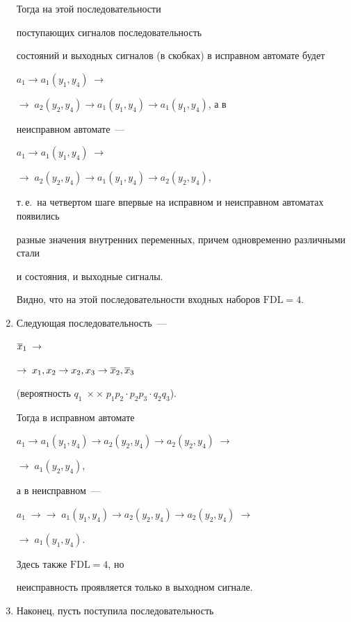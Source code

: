 \begin{multicols}{2}
\begin{enumerate}[(1)]
Тогда на этой последовательности\linebreak


 по\-сту\-па\-ющих сигналов последовательность


состояний и выходных сигналов (в скобках) в исправном автомате будет


$a_1 \to a_1(y_1,y_4)\; \to$\linebreak


$\to\;a_2(y_2,y_4) \to a_1(y_1,y_4) \to a_1(y_1,y_4)$, а в


неисправном автомате~---


$a_1 \to a_1(y_1,y_4)\; \to$\linebreak


$\to\;a_2(y_2,y_4) \to a_1(y_1,y_4) \to a_2(y_2,y_4)$,


т.\,е.\ на четвертом шаге впервые на исправном и неисправном автоматах появились


разные значения внутренних переменных, причем одновременно различными стали


и состояния, и выходные сигналы.


Видно, что на этой последовательности входных наборов $\mathrm{FDL} = 4$.


\item Следующая последовательность~---


$\overline x_1\;\to$\linebreak


$\to\;x_1,x_2 \to x_2,x_3 \to \overline x_2,\overline x_3$


(вероятность $q_1\; \times$\linebreak $\times\;p_1 p_2 \cdot p_2 p_3 \cdot q_2 q_3$).


Тогда в исправном автомате


$a_1 \to a_1(y_1,y_4) \to a_2(y_2,y_4) \to a_2(y_2,y_4)\;\to$\linebreak


$\to\;a_1(y_2,y_4)$,


а в неисправном~---


$a_1\;\to$\linebreak $\to\;a_1(y_1,y_4) \to a_2(y_2,y_4) \to a_2(y_2,y_4)\; \to$\linebreak


$\to\;a_1(y_1,y_4)$.


Здесь также $\mathrm{FDL} = 4$, но\linebreak


 неисправность проявляется только в выходном сигнале.


\item Наконец, пусть поступила последовательность



\end{enumerate}
\end{multicols}
